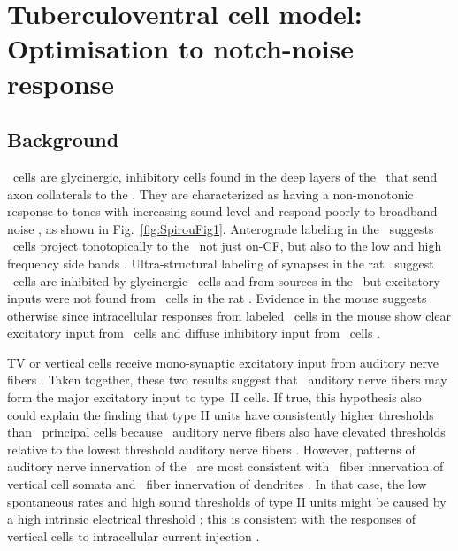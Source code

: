 
\section[TV Cell Model]{Tuberculoventral cell model: Optimisation to notch-noise response \label{sec:TV-cell-model}}

\subsection{Background}

\TV~cells are glycinergic, inhibitory cells found in the deep layers of the
\DCN~that send axon collaterals to the \VCN\@. They are characterized as having
a non-monotonic response to tones with increasing sound level and respond poorly
to broadband noise
\citep{SpirouDavisEtAl:1999,NelkenYoung:1997,ReissYoung:2005}, as shown in
Fig.~\ref{fig:SpirouFig1}.  Anterograde labeling in the \DCN~suggests \TV~cells
project tonotopically to the \VCN~not just on-CF, but also to the low and high
frequency side bands
\citep{MunirathinamOstapoffEtAl:2004,OstapoffMorestEtAl:1999}.  Ultra-structural
labeling of synapses in the rat \DCN~suggest \TV~cells are inhibited by
glycinergic \DS~cells and from sources in the \DCN~but excitatory inputs were
not found from \TS~cells in the rat \citep{Rubio:2005}. Evidence in the mouse
suggests otherwise since intracellular responses from labeled \TV~cells in the
mouse show clear excitatory input from \TS~cells and diffuse inhibitory input
from \DS~cells \citep{ZhangOertel:1993b,WickesbergOertel:1993}.


TV or vertical cells receive mono-synaptic excitatory input from auditory nerve
ﬁbers \citep{OertelWu:1989,ZhangOertel:1993b}. Taken together, these two results
suggest that \LSR~auditory nerve ﬁbers may form the major excitatory input to
type~II cells. If true, this hypothesis also could explain the ﬁnding that type
II units have consistently higher thresholds than \DCN~principal cells
\citep{YoungBrownell:1976} because \LSR~auditory nerve ﬁbers also have elevated
thresholds relative to the lowest threshold auditory nerve ﬁbers
\citep{Liberman:1978}. However, patterns of auditory nerve innervation of the
\DCN~are most consistent with \HSR~ﬁber innervation of vertical cell somata and
\LSR~ﬁber innervation of dendrites \citep{Liberman:1993}. In that case, the low
spontaneous rates and high sound thresholds of type II units might be caused by
a high intrinsic electrical threshold \citep{HancockDavisEtAl:1997}; this is
consistent with the responses of vertical cells to intracellular current
injection \citep{DingVoigt:1997,ZhangOertel:1993b}.

